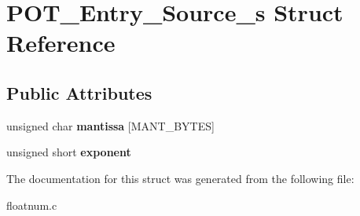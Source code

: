 \hypertarget{struct_p_o_t___entry___source__s}{\section{P\-O\-T\-\_\-\-Entry\-\_\-\-Source\-\_\-s Struct Reference}
\label{struct_p_o_t___entry___source__s}
}
\subsection*{Public Attributes}
\begin{DoxyCompactItemize}
\item 
\hypertarget{struct_p_o_t___entry___source__s_a7e5456d2cb38696b61a0b5a703481237}{unsigned char {\bfseries mantissa} \mbox{[}M\-A\-N\-T\-\_\-\-B\-Y\-T\-E\-S\mbox{]}}\label{struct_p_o_t___entry___source__s_a7e5456d2cb38696b61a0b5a703481237}

\item 
\hypertarget{struct_p_o_t___entry___source__s_ab836b4c4b787c36b48d3bd6f01d79123}{unsigned short {\bfseries exponent}}\label{struct_p_o_t___entry___source__s_ab836b4c4b787c36b48d3bd6f01d79123}

\end{DoxyCompactItemize}


The documentation for this struct was generated from the following file\-:\begin{DoxyCompactItemize}
\item 
floatnum.\-c\end{DoxyCompactItemize}
